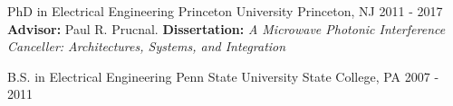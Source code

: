 

\begin{cventries}

  \cventry
    {PhD in Electrical Engineering} %
    {Princeton University} %
    {Princeton, NJ} %
    {2011 - 2017} %
    {
    \textbf{Advisor:} Paul R. Prucnal. \textbf{Dissertation:} \textit{A Microwave Photonic Interference Canceller: Architectures, Systems, and Integration}
    }

  \cventry
    {B.S. in Electrical Engineering}
    {Penn State University}
    {State College, PA}
    {2007 - 2011}
    {}

\end{cventries}
